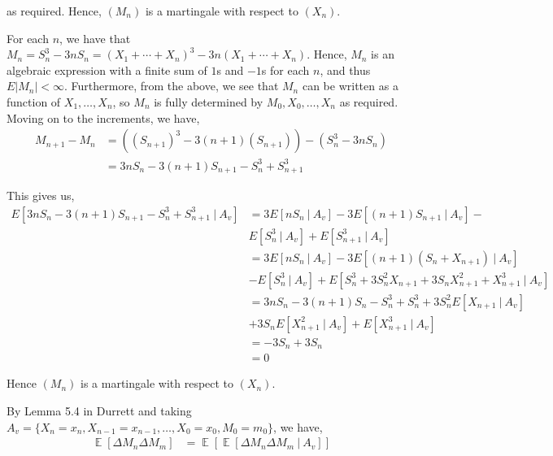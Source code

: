 \documentclass[12pt]{article}
\newenvironment{problem}[2][Problem]{\begin{trivlist}
\item[\hskip \labelsep {\bfseries #1}\hskip \labelsep {\bfseries #2.}]}{\end{trivlist}}
\DeclareMathOperator*{\E}{\mathbb{E}}
\begin{document}
as required. Hence, $(M_n)$ is a martingale with respect to $(X_n)$.

\begin{problem}{II}
\end{problem}

For each $n$, we have that $M_n = S_n^3 - 3nS_n = (X_1 + \cdots + X_n)^3 -  3n(X_1 + \cdots + X_n)$. Hence, $M_n$ is an algebraic expression with a finite sum of $1$s and $-1$s for each $n$, and thus $E|M_n| < \infty$. Furthermore, from the above, we see that $M_n$ can be written as a function of $X_1, \ldots, X_n$, so $M_n$ is fully determined by $M_0, X_0, \ldots, X_n$ as required.\\

Moving on to the increments, we have,
\begin{align*}
M_{n+1} - M_n &= ((S_{n+1})^3 - 3(n+1)(S_{n+1})) - (S_n^3 - 3nS_n)\\
&= 3nS_n - 3(n+1)S_{n+1} - S_n^3 + S_{n+1}^3
\end{align*}

This gives us,
\begin{align*}
E\left[3nS_n - 3(n+1)S_{n+1} - S_n^3 + S_{n+1}^3 \ | \ A_v\right] &= 3E\left[nS_n \ | \ A_v\right] - 3E\left[(n+1)S_{n+1} \ | \ A_v\right] -\\
&E\left[S_n^3 \ | \ A_v\right] + E\left[S_{n+1}^3 \ | \ A_v\right]\\
&= 3E\left[nS_n \ | \ A_v\right] - 3E\left[(n+1)(S_{n} + X_{n+1}) \ | \ A_v\right] \\
&- E\left[S_n^3 \ | \ A_v\right] + E\left[S_n^3 + 3S_n^2X_{n+1} + 3S_nX_{n+1}^2 + X_{n+1}^3 \ | \ A_v\right]\\
&= 3nS_n - 3(n+1)S_{n} - S_n^3 + S_{n}^3 + 3S_n^2 E\left[X_{n+1} \ | \ A_v \right]\\
&+ 3S_nE[X_{n+1}^2 \ | \ A_v] + E[X_{n+1}^3 \ | \ A_v]\\
&= -3S_n + 3S_n\\
&= 0
\end{align*}

Hence $(M_n)$ is a martingale with respect to $(X_n)$.

\begin{problem}{III}
\end{problem}

By Lemma 5.4 in Durrett and taking $A_v = \{X_n = x_n, X_{n-1} = x_{n-1}, \ldots, X_0 = x_0, M_0 = m_0\}$, we have,
\begin{align*}
\E\left[\Delta M_n \Delta M_m\right] &= \E\left[\E\left[\Delta M_n \Delta M_m \ | \ A_v\right]\right]\\
\end{align*}
\end{document}
